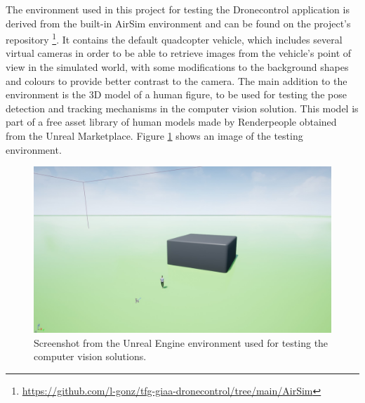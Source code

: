 The environment used in this project for testing the Dronecontrol application is derived from the built-in AirSim environment and can be found on the project's repository \footnote{\url{https://github.com/l-gonz/tfg-giaa-dronecontrol/tree/main/AirSim}}.
It contains the default quadcopter vehicle, which includes several virtual cameras in order to be able to retrieve images from the vehicle's point of view in the simulated world, with some modifications to the background shapes and colours to provide better contrast to the camera.
The main addition to the environment is the 3D model of a human figure, to be used for testing the pose detection and tracking mechanisms in the computer vision solution.
This model is part of a free asset library of human models made by Renderpeople \cite{render-people} obtained from the Unreal Marketplace.
Figure \ref{fig:unreal-env} shows an image of the testing environment.


\begin{figure}
  \centering
  \includegraphics[width=\textwidth,keepaspectratio]{img/unreal-env.jpg}
  \caption{Screenshot from the Unreal Engine environment used for testing the computer vision solutions.}
  \label{fig:unreal-env}
\end{figure}


